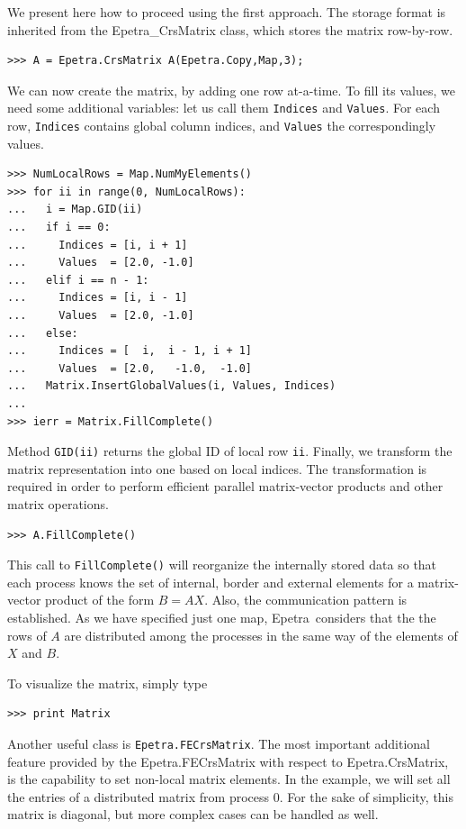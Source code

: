 \documentclass[10pt,relax]{SANDreport}
\newcommand{\epetra}{{Epetra}}
\begin{document}
We present here how to proceed using the first approach. The storage format is
inherited from the Epetra\_CrsMatrix class, which stores the matrix
row-by-row. 
\begin{verbatim}
>>> A = Epetra.CrsMatrix A(Epetra.Copy,Map,3);
\end{verbatim}
We can now create the matrix, by adding one row at-a-time.
To fill its values, we
need some additional variables: let us call them \verb!Indices! and
\verb!Values!. For each row, \verb!Indices! contains global column
indices, and \verb!Values! the correspondingly values.
\begin{verbatim}
>>> NumLocalRows = Map.NumMyElements()
>>> for ii in range(0, NumLocalRows):
...   i = Map.GID(ii)
...   if i == 0:
...     Indices = [i, i + 1]
...     Values  = [2.0, -1.0]
...   elif i == n - 1:
...     Indices = [i, i - 1]
...     Values  = [2.0, -1.0]
...   else:
...     Indices = [  i,  i - 1, i + 1]
...     Values  = [2.0,   -1.0,  -1.0]
...   Matrix.InsertGlobalValues(i, Values, Indices)
...
>>> ierr = Matrix.FillComplete()
\end{verbatim}
Method \verb!GID(ii)! returns the global ID of local row \verb!ii!.
Finally, we
transform the matrix representation into one based on local indices. The
transformation is required in order to perform efficient parallel
matrix-vector products and other matrix operations.
\begin{verbatim}
>>> A.FillComplete()
\end{verbatim}
This call to \verb!FillComplete()! will reorganize the internally stored
data so that each process knows the set of internal, border and external
elements for a matrix-vector product of the form $B = AX$. Also, the
communication pattern is established. As we have specified just one map,
\epetra\ considers that the the rows of $A$ are distributed among the
processes in the same way of the elements of $X$ and $B$.

To visualize the matrix, simply type
\begin{verbatim}
>>> print Matrix
\end{verbatim}

Another useful class is {\tt Epetra.FECrsMatrix}.
The most important additional feature provided by the
Epetra.FECrsMatrix with respect to Epetra.CrsMatrix, is the capability
to set non-local matrix elements. In the
example, we will set all the entries of a distributed matrix from
process 0. For the sake of simplicity, this matrix is diagonal, but more
complex cases can be handled as well.
\end{document}
